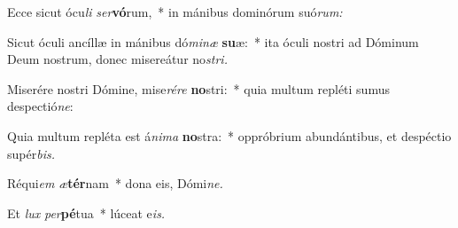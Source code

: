 \item Ecce sicut ócu\textit{li} \textit{ser}\textbf{vó}rum,~* in mánibus dominórum suó\textit{rum:}
\item Sicut óculi ancíllæ in mánibus dó\textit{minæ} \textbf{su}æ:~* ita óculi nostri ad Dóminum Deum nostrum, donec misereátur no\hspace*{0.03em}\textit{stri.}
\item Miserére nostri Dómine, mise\textit{rére} \textbf{no}stri:~* quia multum repléti sumus despectió\textit{ne}:
\item Quia multum repléta est á\hspace*{0.03em}\textit{nima} \textbf{no}stra:~* oppróbrium abundántibus, et despéctio supér\textit{bis.}
\item Réqui\hspace*{0.03em}\textit{em} \textit{æ}\textbf{tér}nam~* dona eis, Dómi\textit{ne.}
\item Et \textit{lux} \textit{per}\textbf{pé}tua~* lúceat e\hspace*{0.03em}\textit{is.}
